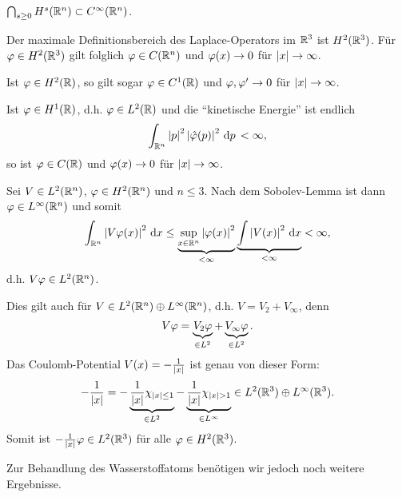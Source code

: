 \begin{bem*}[Folgerungen.]
\begin{bemenum}
\item $\bigcap_{s\ge 0} H^s(\mathbb{R}^n)\subset C^\infty(\mathbb{R}^n)$.
\item Der maximale Definitionsbereich des Laplace-Operators im $\mathbb{R}^3$ ist
$H^2(\mathbb{R}^3)$. Für $\varphi\in H^2(\mathbb{R}^3)$ gilt folglich $\varphi\in C(\mathbb{R}^n)$ und
$\varphi(x)\to 0$ für $\left|x\right|\to\infty$.

Ist $\varphi\in H^2(\mathbb{R})$, so gilt sogar $\varphi\in C^1(\mathbb{R})$ und $\varphi,\varphi'\to 0$ für
$\left|x\right|\to\infty$.

Ist $\varphi\in H^1(\mathbb{R})$, d.h. $\varphi\in L^2(\mathbb{R})$ und die ``kinetische Energie'' ist
endlich
\begin{align*}
\int_{\mathbb{R}^n} \left|p\right|^2\left|\hat{\varphi}(p)\right|^2\,\mathrm{d} p\, < \infty,
\end{align*}
so ist $\varphi\in C(\mathbb{R})$ und $\varphi(x)\to 0$ für $\left|x\right|\to\infty$.
\item Sei $V\in L^2(\mathbb{R}^n)$, $\varphi\in H^2(\mathbb{R}^n)$ und $n\le 3$. Nach dem
Sobolev-Lemma ist dann $\varphi\in L^\infty(\mathbb{R}^n)$ und somit
\begin{align*}
\int_{\mathbb{R}^n} \left|V\varphi(x)\right|^2\,\mathrm{d} x \le
\underbrace{\sup_{x\in\mathbb{R}^n} \left|\varphi(x)\right|^2}_{<\infty}
\underbrace{\int\left|V(x)\right|^2\,\mathrm{d} x}_{<\infty} <
\infty,
\end{align*}
d.h. $V\varphi\in L^2(\mathbb{R}^n)$.

Dies gilt auch für $V\in L^2(\mathbb{R}^n) \oplus L^\infty(\mathbb{R}^n)$, d.h. $V =
V_2+V_\infty$, denn
\begin{align*}
V\varphi = \underbrace{V_2\varphi}_{\in L^2} + \underbrace{V_\infty\varphi}_{\in L^2}.
\end{align*}
Das Coulomb-Potential $V(x) = -\frac{1}{\left|x\right|}$ ist genau von dieser Form:
\begin{align*}
-\frac{1}{\abs{x}} = -\underbrace{\frac{1}{\abs{x}}\chi_{\abs{x}\le 1}}_{\in
L^2} - \underbrace{\frac{1}{\abs{x}}\chi_{\abs{x}>1}}_{\in L^\infty} \in
L^2(\R^3)\oplus L^\infty(\R^3).
\end{align*}
Somit ist $-\frac{1}{\left|x\right|}\varphi\in L^2(\mathbb{R}^3)$  für alle $\varphi\in H^2(\mathbb{R}^3)$.
\maphere
\end{bemenum}
\end{bem*}

Zur Behandlung des Wasserstoffatoms benötigen wir jedoch noch weitere
Ergebnisse.

